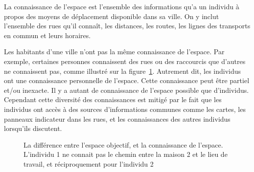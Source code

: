 \documentclass[a4paper]{article}
\newcommand{\comment}[1]{}
\begin{document}
La connaissance de l'espace est l'ensemble des informations qu'a un individu à
propos des moyens de déplacement disponible dans sa ville.  On y inclut
l'ensemble des rues qu'il connaît, les distances, les routes, les lignes des
transports en commun et leurs horaires. \comment{On devrait pouvoir améliorer
cette partie}

Les habitants d'une ville n'ont pas la même connaissance de l'espace. Par
exemple, certaines personnes connaissent des rues ou des raccourcis que d'autres
ne connaissent pas, comme illustré sur la figure~\ref{fig:espace}. Autrement
dit, les individus ont une connaissance personnelle de l'espace. Cette
connaissance peut être partiel et/ou inexacte. Il y a autant de connaissance de
l'espace possible que d'individus. Cependant cette diversité des connaissances
est mitigé par le fait que les individus ont accès à des sources d'informations
communes comme les cartes, les panneaux indicateur dans les rues, et les
connaissances des autres individus lorsqu'ils discutent.

\begin{figure}
  \centering
  \caption{La différence entre l'espace objectif, et la connaissance de
  l'espace. L'individu 1 ne connait pas le chemin entre la maison 2 et le lieu
  de travail, et réciproquement pour l'individu 2}
  \label{fig:espace}
\end{figure}
\end{document}

